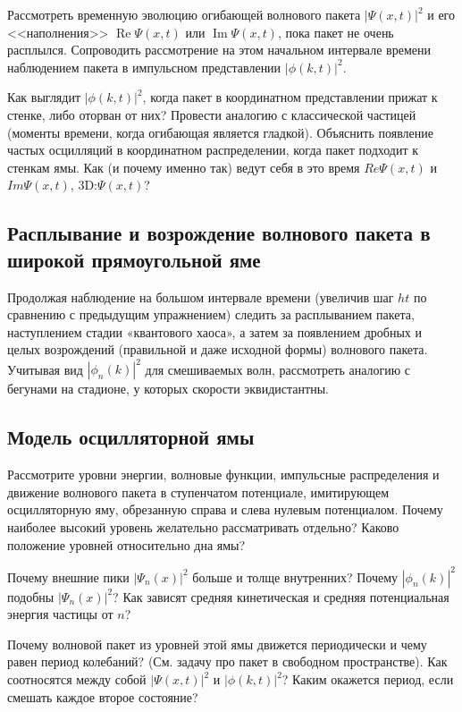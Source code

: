 \documentclass[12pt]{article}
\renewcommand{\Re}{\mathop{\mathrm{Re}}\nolimits}
\renewcommand{\Im}{\mathop{\mathrm{Im}}\nolimits}
\begin{document}
Рассмотреть временную эволюцию огибающей
волнового пакета  $|\Psi (x,t)|^2$ и его <<наполнения>> $\Re
\Psi(x,t)$ или $\Im \Psi(x,t)$, пока пакет не очень расплылся.
Сопроводить рассмотрение на этом начальном интервале времени
наблюдением пакета в импульсном представлении $|\phi(k,t)|^2$.

Как выглядит $|\phi(k,t)|^2$, когда пакет в координатном
представлении прижат к стенке, либо оторван от них?
Провести аналогию с классической частицей
(моменты времени, когда огибающая является гладкой).
Объяснить появление частых осцилляций в координатном
распределении, когда пакет подходит к стенкам ямы. Как (и почему
именно так) ведут себя в это время $Re \Psi(x,t)$ и $Im
\Psi(x,t)$, 3D:$\Psi(x,t)$?

\hypertarget{Revivals WP in well}{}\subsection{Расплывание и
возрождение волнового пакета в широкой прямоугольной яме}
Продолжая наблюдение на большом интервале времени (увеличив шаг
$ht$ по сравнению с предыдущим упражнением) следить за
расплыванием пакета, наступлением стадии «квантового хаоса», а
затем за появлением дробных и целых возрождений (правильной и
даже исходной формы) волнового пакета. Учитывая вид $|\phi_n(k)|
^2$ для смешиваемых волн, рассмотреть аналогию с бегунами на
стадионе, у которых скорости эквидистантны.

\hypertarget{oscillator}{}\subsection{Модель осцилляторной ямы}
Рассмотрите уровни энергии, волновые функции, импульсные
распределения и движение волнового пакета в ступенчатом
потенциале, имитирующем осцилляторную яму, обрезанную справа и
слева нулевым потенциалом. Почему наиболее высокий уровень
желательно  рассматривать отдельно?
Каково положение уровней относительно дна ямы?

Почему внешние пики $|\Psi_n(x)|^2$ больше и толще внутренних?
Почему $|\phi_n(k)|^2$ подобны $|\Psi_n(x)|^2$?
Как зависят
средняя кинетическая и средняя потенциальная энергия частицы от
$n$?

Почему волновой пакет из уровней этой ямы движется
периодически и чему равен период колебаний? (См. задачу про пакет в свободном пространстве). Как соотносятся между собой $|\Psi (x,t)|^2$ и $|\phi(k,t)|^2$?
Каким окажется период, если смешать каждое второе состояние?
\end{document}
